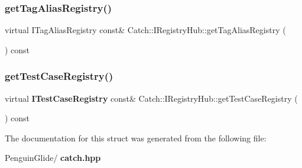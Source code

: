 \mbox{\label{struct_catch_1_1_i_registry_hub_a3c511b1d33e5a6d95c333a0ff387df1a}} 
\subsubsection{getTagAliasRegistry()}
{\footnotesize\ttfamily virtual I\+Tag\+Alias\+Registry const\& Catch\+::\+I\+Registry\+Hub\+::get\+Tag\+Alias\+Registry (\begin{DoxyParamCaption}{ }\end{DoxyParamCaption}) const\hspace{0.3cm}{\ttfamily [pure virtual]}}

\mbox{\label{struct_catch_1_1_i_registry_hub_af4f6255f0c0f8f1f179fa9d7d4843076}} 
\subsubsection{getTestCaseRegistry()}
{\footnotesize\ttfamily virtual \textbf{ I\+Test\+Case\+Registry} const\& Catch\+::\+I\+Registry\+Hub\+::get\+Test\+Case\+Registry (\begin{DoxyParamCaption}{ }\end{DoxyParamCaption}) const\hspace{0.3cm}{\ttfamily [pure virtual]}}



The documentation for this struct was generated from the following file\+:\begin{DoxyCompactItemize}
\item 
Penguin\+Glide/\textbf{ catch.\+hpp}\end{DoxyCompactItemize}
